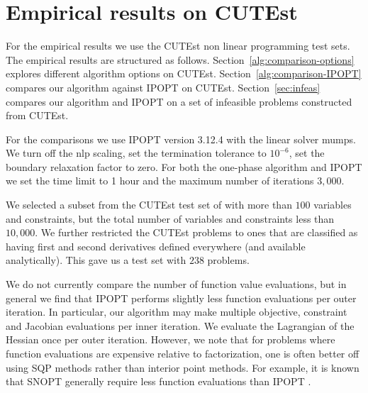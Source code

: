 \documentclass{article}
\begin{document}
\section{Empirical results on CUTEst}\label{sec:empirical-results}

For the empirical results we use the CUTEst non linear programming test sets. The empirical results are structured as follows. Section~\ref{alg:comparison-options} explores different algorithm options on CUTEst.  Section~\ref{alg:comparison-IPOPT} compares our algorithm against IPOPT on CUTEst. Section~\ref{sec:infeas} compares our algorithm and IPOPT on a set of infeasible problems constructed from CUTEst. %

For the comparisons we use IPOPT version 3.12.4 with the linear solver mumps. We turn off the nlp scaling, set the termination tolerance to $10^{-6}$, set the boundary relaxation factor to zero. For both the one-phase algorithm and IPOPT we set the time limit to 1 hour and the maximum number of iterations $3,000$.

We selected a subset from the CUTEst test set of with more than $100$ variables and constraints, but the total number of variables and constraints less than $10,000$. We further restricted the CUTEst problems to ones that are classified as having first and second derivatives defined everywhere (and available analytically). This gave us a test set with $238$ problems.

We do not currently compare the number of function value evaluations, but in general we find that IPOPT performs slightly less function evaluations per outer iteration. In particular, our algorithm may make multiple objective, constraint and Jacobian evaluations per inner iteration. We evaluate the Lagrangian of the Hessian once per outer iteration. However, we note that for problems where function evaluations are expensive relative to factorization, one is often better off using SQP methods rather than interior point methods. For example, it is known that SNOPT generally require less function evaluations than IPOPT \cite[Figure 2, Figure 3]{gill2015performance}. 

\end{document}
